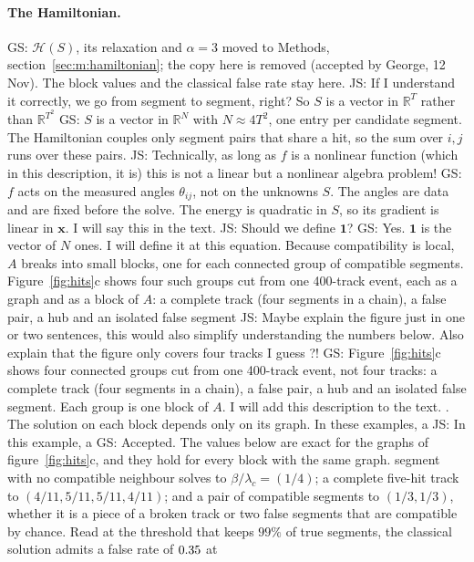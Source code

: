 \documentclass[11pt,a4paper]{article}
\newcommand{\js}[1]{{\color{blue} JS: #1 }}
\newcommand{\gs}[1]{{\color{orange!85!black} GS: #1 }}
\newcommand{\R}{\mathbb{R}}
\begin{document}
\paragraph{The Hamiltonian.}
\gs{$\mathcal{H}(S)$, its relaxation and $\alpha=3$ moved to Methods, section~\mbox{\ref{sec:m:hamiltonian}}; the copy here is removed (accepted by George, 12 Nov). The block values and the classical false rate stay here.}  \js{If I understand it correctly, we go from segment to segment, right? So $S$ is a vector in $\R^T$ rather than $\R^{T^2}$} \gs{$S$ is a vector in $\R^N$ with $N\approx4T^2$, one entry per candidate segment. The Hamiltonian couples only segment pairs that share a hit, so the sum over $i,j$ runs over these pairs.  } 
  \js{Technically, as long as $f$ is a nonlinear function (which in this description, it is) this is not a linear but a nonlinear algebra problem!} \gs{$f$ acts on the measured angles $\theta_{ij}$, not on the unknowns $S$. The angles are data and are fixed before the solve. The energy is quadratic in $S$, so its gradient is linear in $\mathbf{x}$. I will say this in the text.  }
\js{Should we define $\mathbf{1}$?} \gs{Yes. $\mathbf{1}$ is the vector of $N$ ones. I will define it at this equation.  }
 Because compatibility is local, $A$ breaks into small blocks, one for
each connected group of compatible segments. Figure~\ref{fig:hits}c shows four such groups cut from
one 400-track event, each as a graph and as a block of $A$: a complete track (four segments in a
chain), a false pair, a hub and an isolated false segment \js{Maybe explain the figure just in one or two sentences, this would also simplify understanding the numbers below. Also explain that the figure only covers four tracks I guess ?!} \gs{Figure~\ref{fig:hits}c shows four connected groups cut from one 400-track event, not four tracks: a complete track (four segments in a chain), a false pair, a hub and an isolated false segment. Each group is one block of $A$. I will add this description to the text.  }. The solution on each block depends only on its graph. In these examples, a \js{In this example, a} \gs{Accepted. The values below are exact for the graphs of figure~\ref{fig:hits}c, and they hold for every block with the same graph.  } segment with no compatible neighbour solves to
$\beta/\lambda_c=(1/4)$; a complete five-hit track to $(4/11, 5/11, 5/11, 4/11)$; and a pair of compatible segments to $(1/3, 1/3)$, whether it is a piece of a broken track or two false segments that are compatible by chance. Read at the threshold that keeps
$99\%$ of true segments, the classical solution admits a false rate of $0.35$ at
\end{document}
